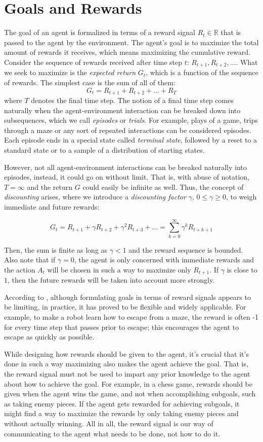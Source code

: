\section{Goals and Rewards}
The goal of an agent is formalized in terms of a reward signal $R_t \in \mathbb{R}$ that is passed to the agent by the environment. The agent's goal is to maximize the total amount of rewards it receives, which means maximizing the cumulative reward. Consider the sequence of rewards received after time step $t$: $R_{t+1}, R_{t+2}, \dots$. What we seek to maximize is the \textit{expected return} $G_t$, which is a function of the sequence of rewards. The simplest case is the sum of all of them:
\[
    G_t = R_{t+1} + R_{t+2} + \dots + R_T
\]
where $T$ denotes the final time step. The notion of a final time step comes naturally when the agent-environment interaction can be breaked down into subsequences, which we call \textit{episodes} or \textit{trials}. For example, plays of a game, trips through a maze or any sort of repeated interactions can be considered episodes. Each episode ends in a special state called \textit{terminal state}, followed by a reset to a standard state or to a sample of a distribution of starting states.

However, not all agent-environment interactions can be breaked naturally into episodes, instead, it could go on without limit. That is, with abuse of notation, $T = \infty$ and the return $G$ could easily be infinite as well. Thus, the concept of \textit{discounting} arises, where we introduce a \textit{discounting factor} $\gamma$, $0 \leq \gamma \geq 0$, to weigh immediate and future rewards:

\[
    G_t = R_{t+1} + \gamma R_{t+2} + \gamma^2 R_{t+3} + \dots = \sum_{k=0}^{\infty}\gamma^k R_{t+k+1}
\]

Then, the sum is finite as long as $\gamma < 1$ and the reward sequence is bounded. Also note that if $\gamma = 0$, the agent is only concerned with immediate rewards and the action $A_t$ will be chosen in such a way to maximize only $R_{t+1}$. If $\gamma$ is close to $1$, then the future rewards will be taken into account more strongly.

According to \cite{suttonbarto}, although formulating goals in terms of reward signals appears to be limiting, in practice, it has proved to be flexible and widely applicable. For example, to make a robot learn how to escape from a maze, the reward is often -1 for every time
step that passes prior to escape; this encourages the agent to escape as quickly as possible.

While designing how rewards should be given to the agent, it's crucial that it's done in such a way maximizing also makes the agent achieve the goal. That is, the reward signal must not be used to impart any prior knowledge to the agent about how to achieve the goal. For example, in a chess game, rewards should be given when the agent wins the game, and not when accomplishing subgoals, such as taking enemy pieces. If the agent gets rewarded for achieving subgoals, it might find a way to maximize the rewards by only taking enemy pieces and without actually winning. All in all, the reward signal is our way of communicating to the agent what needs to be done, not how to do it. 